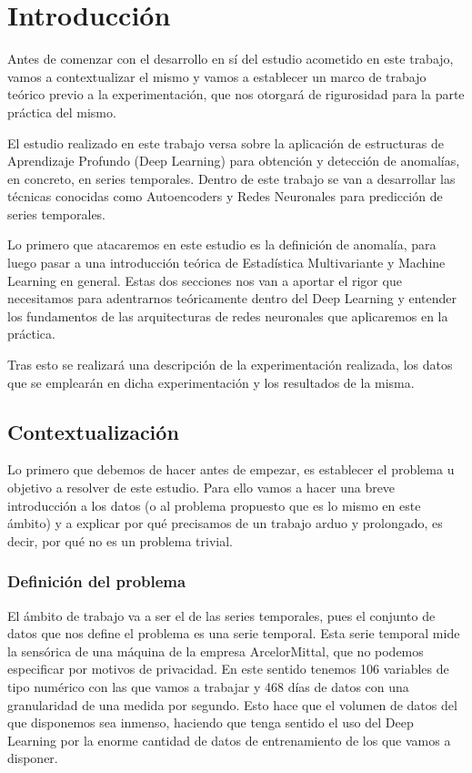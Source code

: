 \chapter{Introducción}
\label{chapter:introduccion}
\setcounter{page}{1}

Antes de comenzar con el desarrollo en sí del estudio acometido en este trabajo, vamos a contextualizar el mismo y vamos a establecer un marco de trabajo teórico previo a la experimentación, que nos otorgará de rigurosidad para la parte práctica del mismo.

El estudio realizado en este trabajo versa sobre la aplicación de estructuras de Aprendizaje Profundo (Deep Learning) para obtención y detección de anomalías, en concreto, en series temporales. Dentro de este trabajo se van a desarrollar las técnicas conocidas como Autoencoders y Redes Neuronales para predicción de series temporales.

Lo primero que atacaremos en este estudio es la definición de anomalía, para luego pasar a una introducción teórica de Estadística Multivariante y Machine Learning en general. Estas dos secciones nos van a aportar el rigor que necesitamos para adentrarnos teóricamente dentro del Deep Learning y entender los fundamentos de las arquitecturas de redes neuronales que aplicaremos en la práctica.

Tras esto se realizará una descripción de la experimentación realizada, los datos que se emplearán en dicha experimentación y los resultados de la misma. 


\section{Contextualización}

Lo primero que debemos de hacer antes de empezar, es establecer el problema u objetivo a resolver de este estudio. Para ello vamos a hacer una breve introducción a los datos (o al problema propuesto que es lo mismo en este ámbito) y a explicar por qué precisamos de un trabajo arduo y prolongado, es decir, por qué no es un problema trivial.

\subsection{Definición del problema}

El ámbito de trabajo va a ser el de las series temporales, pues el conjunto de datos que nos define el problema es una serie temporal. Esta serie temporal mide la sensórica de una máquina de la empresa ArcelorMittal, que no podemos especificar por motivos de privacidad. En este sentido tenemos 106 variables de tipo numérico con las que vamos a trabajar y 468 días de datos con una granularidad de una medida por segundo. Esto hace que el volumen de datos del que disponemos sea inmenso, haciendo que tenga sentido el uso del Deep Learning por la enorme cantidad de datos de entrenamiento de los que vamos a disponer.

